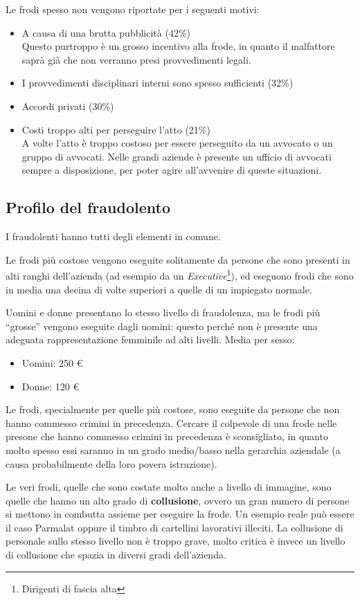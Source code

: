 Le frodi spesso non vengono riportate per i seguenti motivi:
\begin{itemize}
  \item A causa di una brutta pubblicità (42\%) \\
  Questo purtroppo è un grosso incentivo alla frode, in quanto il malfattore
  saprà già che non verranno presi provvedimenti legali.
  \item I provvedimenti disciplinari interni sono spesso sufficienti (32\%)
  \item Accordi privati (30\%)
  \item Costi troppo alti per perseguire l'atto (21\%) \\
  A volte l'atto è troppo costoso per essere perseguito da un avvocato o un
  gruppo di avvocati. Nelle grandi aziende è presente un ufficio di avvocati
  sempre a disposizione, per poter agire all'avvenire di queste situazioni.
\end{itemize}

\subsection{Profilo del fraudolento}

I fraudolenti hanno tutti degli elementi in comune.

Le frodi più costose vengono eseguite solitamente da persone che sono presenti
in alti ranghi dell'azienda (ad esempio da un 
\textit{Executive}\footnote{Dirigenti di
fascia alta}), ed eseguono frodi che sono in media una decina di volte
superiori a quelle di un impiegato normale.

Uomini e donne presentano lo stesso livello di fraudolenza, ma le frodi più
``grosse'' vengono eseguite dagli uomini: questo perché non è presente una
adeguata rappresentazione femminile ad alti livelli.
Media per sesso:
\begin{itemize}
  \item Uomini: 250 \euro
  \item Donne: 120 \euro
\end{itemize}

Le frodi, specialmente per quelle più costose, sono eseguite da persone che non
hanno commesso crimini in precedenza.
Cercare il colpevole di una frode nelle presone che hanno commesso
 crimini in precedenza è sconsigliato, in quanto molto spesso essi saranno in
un grado medio/basso nella gerarchia aziendale (a causa probabilmente della 
loro povera istruzione).

Le veri frodi, quelle che sono costate molto anche a livello di immagine, sono
quelle che hanno un alto grado di \textbf{collusione}, ovvero un gran numero di
persone si mettono in combutta assieme per eseguire la frode. Un esempio 
reale può essere il caso Parmalat oppure il timbro di cartellini lavorativi 
illeciti. La collusione di personale sullo stesso livello non è troppo grave, 
molto critica è invece un livello di collusione che spazia in diversi gradi 
dell'azienda.

